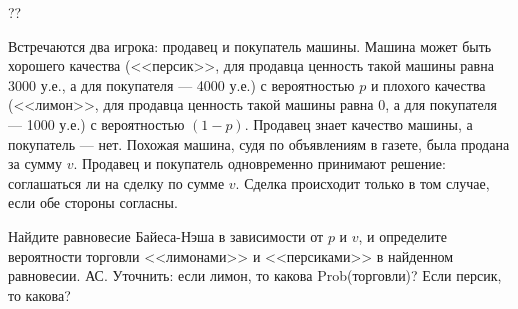 \begin{problem}\par
\begin{source} \cite{slanthcev:gt}??\end{source}
Встречаются два игрока: продавец и покупатель машины. Машина может быть хорошего качества (<<персик>>, для продавца ценность такой машины равна 3000 у.е., а для покупателя --- 4000 у.е.) с вероятностью  $p$  и плохого качества (<<лимон>>, для продавца ценность такой машины равна 0, а для покупателя --- 1000 у.е.) с вероятностью  $\left(1-p\right)$. Продавец знает качество машины, а покупатель --- нет. Похожая машина, судя по объявлениям в газете, была продана за сумму  $v$. Продавец и покупатель одновременно принимают решение: соглашаться ли на сделку по сумме  $v$. Сделка происходит только в том случае, если обе стороны согласны.\par
Найдите равновесие Байеса-Нэша в зависимости от  $p$  и  $v$,  и определите вероятности торговли <<лимонами>> и <<персиками>> в найденном равновесии.
{\red АС. Уточнить: если лимон, то какова Prob(торговли)? Если персик, то какова?}


\begin{sol}

\end{sol}
\end{problem}



